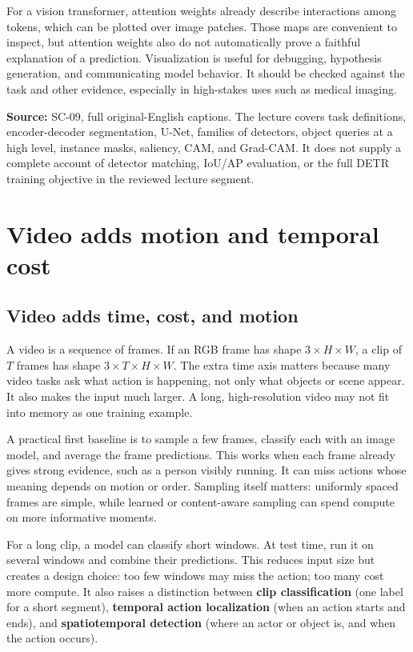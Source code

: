 For a vision transformer, attention weights already describe interactions among tokens, which can be plotted over image patches. Those maps are convenient to inspect, but attention weights also do not automatically prove a faithful explanation of a prediction. Visualization is useful for debugging, hypothesis generation, and communicating model behavior. It should be checked against the task and other evidence, especially in high-stakes uses such as medical imaging.

\textbf{Source:} SC-09, full original-English captions. The lecture covers task definitions, encoder-decoder segmentation, U-Net, families of detectors, object queries at a high level, instance masks, saliency, CAM, and Grad-CAM. It does not supply a complete account of detector matching, IoU/AP evaluation, or the full DETR training objective in the reviewed lecture segment.

\section{Video adds motion and temporal cost}\label{04-visual-computing-ii-ch031-video-adds-motion-and-temporal-cost}

\subsection{Video adds time, cost, and motion}\label{04-visual-computing-ii-ch031-video-adds-time-cost-and-motion}

A video is a sequence of frames. If an RGB frame has shape \(3\times H\times W\), a clip of \(T\) frames has shape \(3\times T\times H\times W\). The extra time axis matters because many video tasks ask what action is happening, not only what objects or scene appear. It also makes the input much larger. A long, high-resolution video may not fit into memory as one training example.

A practical first baseline is to sample a few frames, classify each with an image model, and average the frame predictions. This works when each frame already gives strong evidence, such as a person visibly running. It can miss actions whose meaning depends on motion or order. Sampling itself matters: uniformly spaced frames are simple, while learned or content-aware sampling can spend compute on more informative moments.

For a long clip, a model can classify short windows. At test time, run it on several windows and combine their predictions. This reduces input size but creates a design choice: too few windows may miss the action; too many cost more compute. It also raises a distinction between \textbf{clip classification} (one label for a short segment), \textbf{temporal action localization} (when an action starts and ends), and \textbf{spatiotemporal detection} (where an actor or object is, and when the action occurs).

